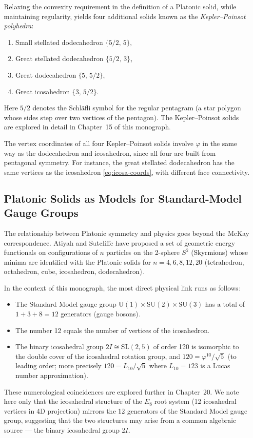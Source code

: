 Relaxing the convexity requirement in the definition of a Platonic solid, while
maintaining regularity, yields four additional solids known as the
\emph{Kepler–Poinsot polyhedra}:
\begin{enumerate}
  \item Small stellated dodecahedron $\{5/2,\,5\}$,
  \item Great stellated dodecahedron $\{5/2,\,3\}$,
  \item Great dodecahedron $\{5,\,5/2\}$,
  \item Great icosahedron $\{3,\,5/2\}$.
\end{enumerate}
Here $5/2$ denotes the Schläfli symbol for the regular pentagram (a star polygon
whose sides step over two vertices of the pentagon).  The Kepler–Poinsot solids
are explored in detail in Chapter~15 of this monograph.

The vertex coordinates of all four Kepler–Poinsot solids involve $\varphi$ in
the same way as the dodecahedron and icosahedron, since all four are built from
pentagonal symmetry.  For instance, the great stellated dodecahedron has the
same vertices as the icosahedron \eqref{eq:icosa-coords}, with different face
connectivity.

\subsection{Platonic Solids as Models for Standard-Model Gauge Groups}
\label{sec:gauge-groups}

The relationship between Platonic symmetry and physics goes beyond the
McKay correspondence.  Atiyah and Sutcliffe \cite{atiyah_sutcliffe_polyhedra}
have proposed a set of geometric energy functionals on configurations of
$n$ particles on the 2-sphere $S^2$ (Skyrmions) whose minima are identified with
the Platonic solids for $n = 4, 6, 8, 12, 20$ (tetrahedron, octahedron, cube,
icosahedron, dodecahedron).

In the context of this monograph, the most direct physical link runs as follows:
\begin{itemize}
  \item The Standard Model gauge group $\mathrm{U}(1) \times \mathrm{SU}(2)
        \times \mathrm{SU}(3)$ has a total of $1 + 3 + 8 = 12$ generators (gauge
        bosons).
  \item The number 12 equals the number of vertices of the icosahedron.
  \item The binary icosahedral group $2I \cong \mathrm{SL}(2,5)$ of order 120
        is isomorphic to the double cover of the icosahedral rotation group,
        and $120 = \varphi^{10}/\sqrt{5}$ (to leading order; more precisely
        $120 = L_{10}/\sqrt{5}$ where $L_{10} = 123$ is a Lucas number
        approximation).
\end{itemize}
These numerological coincidences are explored further in Chapter~20.
We note here only that the icosahedral structure of the $E_8$ root system
(12 icosahedral vertices in 4D projection) mirrors the 12 generators of the
Standard Model gauge group, suggesting that the two structures may arise from a
common algebraic source — the binary icosahedral group $2I$.


